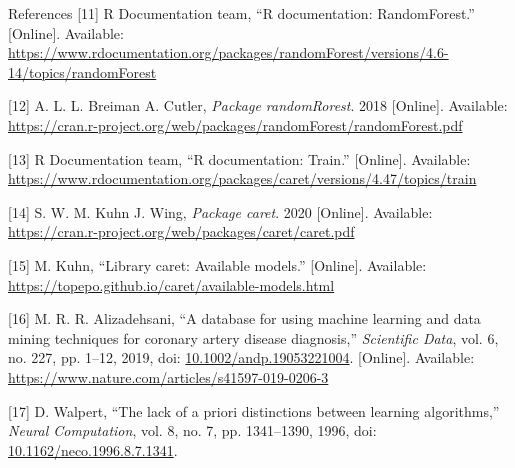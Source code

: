 \documentclass[
  ignorenonframetext,
]{beamer}
\begin{document}
\begin{frame}{References}
\leavevmode\hypertarget{ref-rfunrandomforest}{}%
{[}11{]} R Documentation team, ``R documentation: RandomForest.''
{[}Online{]}. Available:
\url{https://www.rdocumentation.org/packages/randomForest/versions/4.6-14/topics/randomForest}

\leavevmode\hypertarget{ref-rbibrandomforest}{}%
{[}12{]} A. L. L. Breiman A. Cutler, \emph{Package randomRorest}. 2018
{[}Online{]}. Available:
\url{https://cran.r-project.org/web/packages/randomForest/randomForest.pdf}

\leavevmode\hypertarget{ref-rfuntrain}{}%
{[}13{]} R Documentation team, ``R documentation: Train.'' {[}Online{]}.
Available:
\url{https://www.rdocumentation.org/packages/caret/versions/4.47/topics/train}

\leavevmode\hypertarget{ref-rbibcaret}{}%
{[}14{]} S. W. M. Kuhn J. Wing, \emph{Package caret}. 2020 {[}Online{]}.
Available: \url{https://cran.r-project.org/web/packages/caret/caret.pdf}

\leavevmode\hypertarget{ref-kuhnam}{}%
{[}15{]} M. Kuhn, ``Library caret: Available models.'' {[}Online{]}.
Available: \url{https://topepo.github.io/caret/available-models.html}

\leavevmode\hypertarget{ref-alizedah2019}{}%
{[}16{]} M. R. R. Alizadehsani, ``A database for using machine learning
and data mining techniques for coronary artery disease diagnosis,''
\emph{Scientific Data}, vol. 6, no. 227, pp. 1--12, 2019, doi:
\href{https://doi.org/10.1002/andp.19053221004}{10.1002/andp.19053221004}.
{[}Online{]}. Available:
\url{https://www.nature.com/articles/s41597-019-0206-3}

\leavevmode\hypertarget{ref-walpert1996}{}%
{[}17{]} D. Walpert, ``The lack of a priori distinctions between
learning algorithms,'' \emph{Neural Computation}, vol. 8, no. 7, pp.
1341--1390, 1996, doi:
\href{https://doi.org/10.1162/neco.1996.8.7.1341}{10.1162/neco.1996.8.7.1341}.

\end{frame}
\end{document}
